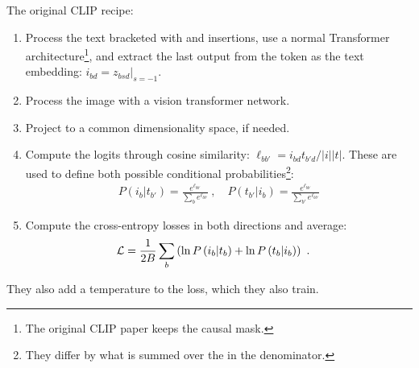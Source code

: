 The original CLIP recipe:
\begin{enumerate}
    \item Process the text bracketed with \pyinline{[SOS]} and \pyinline{[EOS]} insertions, use a
        normal Transformer architecture\footnote{The original CLIP paper keeps the causal mask.},
        and extract the last output from the \pyinline{[EOS]} token as the text embedding: $ i _{ bd
        }= z _{ bsd }\big|_{ s=-1 } $.
    \item Process the image with a vision transformer network.
    \item Project to a common dimensionality space, if needed.
    \item Compute the logits through cosine similarity: $ \ell _{ b b' } = i _{ bd }t _{ b'd }/ |i||t| $. These are used to
        define both possible conditional probabilities\footnote{They differ by what is summed over the in the denominator.}:
        \begin{align}
         P(i_b|t _{ b' }) =  \frac{ e ^{ \ell _{b b'} } }{ \sum _{ b  } e ^{ \ell _{b b'} } }  \ ,
         \quad P(t _{ b' }| i _{ b }) =  \frac{ e ^{ \ell _{b b'} } }{ \sum _{ b' }  e ^{ \ell _{b b'} } }
        \end{align}
    \item Compute the cross-entropy losses in both directions and average:
        \begin{align}
           \mathcal{L}  &= \frac{ 1 }{ 2B }\sum _{ b } \left (\ln P \left ( i_b|t_b \right ) + \ln P \left ( t_b|i_b \right )\right ) \label{eq_clip_loss} \ .
        \end{align}
\end{enumerate}
They also add a temperature to the loss, which they also train.

